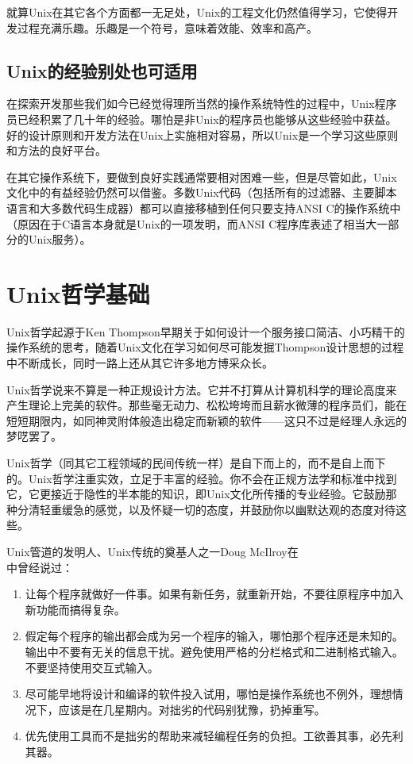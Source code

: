 \documentclass[12pt,oneside]{book}
\begin{document}
就算Unix在其它各个方面都一无足处，Unix的工程文化仍然值得学习，它使得开发过程充满乐趣。乐趣是一个符号，意味着效能、效率和高产。

\subsection{Unix的经验别处也可适用}
在探索开发那些我们如今已经觉得理所当然的操作系统特性的过程中，Unix程序员已经积累了几十年的经验。哪怕是非Unix的程序员也能够从这些经验中获益。好的设计原则和开发方法在Unix上实施相对容易，所以Unix是一个学习这些原则和方法的良好平台。

在其它操作系统下，要做到良好实践通常要相对困难一些，但是尽管如此，Unix文化中的有益经验仍然可以借鉴。多数Unix代码（包括所有的过滤器、主要脚本语言和大多数代码生成器）都可以直接移植到任何只要支持ANSI C的操作系统中（原因在于C语言本身就是Unix的一项发明，而ANSI C程序库表述了相当大一部分的Unix服务）。


\section{Unix哲学基础}
Unix哲学起源于Ken Thompson早期关于如何设计一个服务接口简洁、小巧精干的操作系统的思考，随着Unix文化在学习如何尽可能发掘Thompson设计思想的过程中不断成长，同时一路上还从其它许多地方博采众长。

Unix哲学说来不算是一种正规设计方法。它并不打算从计算机科学的理论高度来产生理论上完美的软件。那些毫无动力、松松垮垮而且薪水微薄的程序员们，能在短短期限内，如同神灵附体般造出稳定而新颖的软件——这只不过是经理人永远的梦呓罢了。
    
Unix哲学（同其它工程领域的民间传统一样）是自下而上的，而不是自上而下的。Unix哲学注重实效，立足于丰富的经验。你不会在正规方法学和标准中找到它，它更接近于隐性的半本能的知识，即Unix文化所传播的专业经验。它鼓励那种分清轻重缓急的感觉，以及怀疑一切的态度，并鼓励你以幽默达观的态度对待这些。
   
Unix管道的发明人、Unix传统的奠基人之一Doug McIlroy在\\ \cite{McIlroy78}中曾经说过：
\begin{enumerate}
\renewcommand{\labelenumi}{（\roman{enumi}）}
\item 让每个程序就做好一件事。如果有新任务，就重新开始，不要往原程序中加入新功能而搞得复杂。
\item 假定每个程序的输出都会成为另一个程序的输入，哪怕那个程序还是未知的。输出中不要有无关的信息干扰。避免使用严格的分栏格式和二进制格式输入。不要坚持使用交互式输入。
\item 尽可能早地将设计和编译的软件投入试用，哪怕是操作系统也不例外，理想情况下，应该是在几星期内。对拙劣的代码别犹豫，扔掉重写。
\item 优先使用工具而不是拙劣的帮助来减轻编程任务的负担。工欲善其事，必先利其器。
\end{enumerate}
\end{document}
